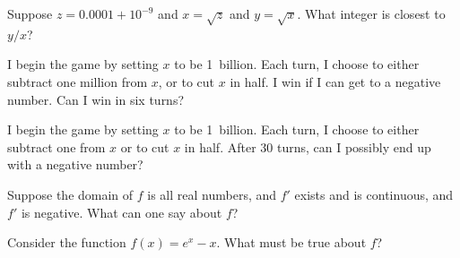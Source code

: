 \documentclass{ximera}
\begin{document}
\begin{problem}
  Suppose $z = 0.0001 + 10^{-9}$ and $x = \sqrt{z}$ and $y = \sqrt{x}$.  What integer is closest to $y/x$?
  \begin{multipleChoice}
  \end{multipleChoice}
\end{problem}

\begin{problem}
  I begin the game by setting $x$ to be 1~billion.  Each turn, I
  choose to either subtract one million from $x$, or to cut $x$ in
  half.  I win if I can get to a negative number.  Can I win in six
  turns?
  \begin{multipleChoice}
  \end{multipleChoice}
\end{problem}

\begin{problem}
  I begin the game by setting $x$ to be 1~billion.  Each turn, I
  choose to either subtract one from $x$ or to cut $x$ in half.  After
  30 turns, can I possibly end up with a negative number?
  \begin{multipleChoice}
  \end{multipleChoice}
\end{problem}


\begin{problem}
  Suppose the domain of $f$ is all real numbers, and $f'$ exists and is continuous, and $f'$ is negative.  What can one say about $f$?
  \begin{multipleChoice}
  \end{multipleChoice}
\end{problem}

\begin{problem}
  Consider the function $f(x) = e^x - x$.  What must be true about $f$?
  \begin{multipleChoice}
  \end{multipleChoice}
\end{problem}
\end{document}
